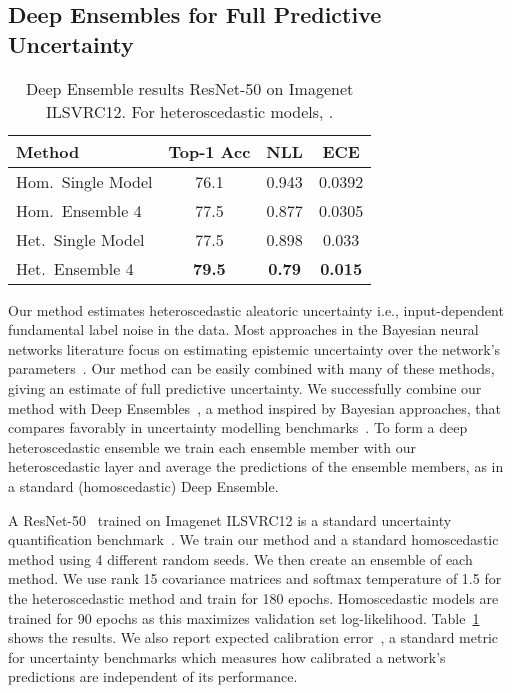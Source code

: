 \documentclass[final]{cvpr}
\begin{document}
\subsection{Deep Ensembles for Full Predictive Uncertainty}
\label{sec:deep_ensembles}

\begin{table}[tbh]
\centering
\begin{tabular}{lccc}
\toprule
Method & Top-1 Acc & NLL & ECE \\
\midrule
Hom.\ Single Model & 76.1 & 0.943 & 0.0392 \\
Hom.\ Ensemble 4 & 77.5 & 0.877 & 0.0305\\ 
\midrule
Het.\ Single Model  & 77.5 & 0.898 & 0.033\\ 
Het.\ Ensemble 4 & \textbf{79.5} & \textbf{0.79} & \textbf{0.015}\\ 
\bottomrule
\end{tabular}
\caption{Deep Ensemble results ResNet-50 on Imagenet ILSVRC12. For heteroscedastic models, .}
\label{table:deep_ensembles}
\end{table}

Our method estimates heteroscedastic aleatoric uncertainty i.e., input-dependent fundamental label noise in the data. Most approaches in the Bayesian neural networks literature focus on estimating epistemic uncertainty over the network's parameters~\cite{gal2016dropout,gal2017concrete,blundell2015weight, neal1995bayesian, wilson2020bayesian, wenzel2020good,lakshminarayanan2017simple}. Our method can be easily combined with many of these methods, giving an estimate of full predictive uncertainty. We successfully combine our method with Deep Ensembles~\cite{lakshminarayanan2017simple}, a method inspired by Bayesian approaches, that compares favorably in uncertainty modelling benchmarks~\cite{snoek2019can, gustafsson2019evaluating}. To form a deep heteroscedastic ensemble we train each ensemble member with our heteroscedastic layer and average the predictions of the ensemble members, as in a standard (homoscedastic) Deep Ensemble.

A ResNet-50~\cite{he2016deep} trained on Imagenet ILSVRC12 is a standard uncertainty quantification benchmark~\cite{dusenberry2020efficient,wen2020combining}. We train our method and a standard homoscedastic method using 4 different random seeds. We then create an ensemble of each method. We use rank 15 covariance matrices and softmax temperature of 1.5 for the heteroscedastic method and train for 180 epochs. Homoscedastic models are trained for 90 epochs as this maximizes validation set log-likelihood. Table~\ref{table:deep_ensembles} shows the results. We also report expected calibration error~\cite{guo2017calibration}, a standard metric for uncertainty benchmarks which measures how calibrated a network's predictions are independent of its performance.
\end{document}
